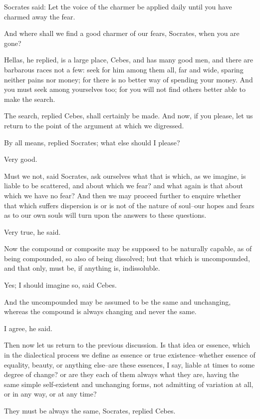 Socrates said: Let the voice of the charmer be applied daily until you
have charmed away the fear.

And where shall we find a good charmer of our fears, Socrates, when you
are gone?

Hellas, he replied, is a large place, Cebes, and has many good men, and
there are barbarous races not a few: seek for him among them all, far
and wide, sparing neither pains nor money; for there is no better way
of spending your money. And you must seek among yourselves too; for you
will not find others better able to make the search.

The search, replied Cebes, shall certainly be made. And now, if
you please, let us return to the point of the argument at which we
digressed.

By all means, replied Socrates; what else should I please?

Very good.

Must we not, said Socrates, ask ourselves what that is which, as we
imagine, is liable to be scattered, and about which we fear? and what
again is that about which we have no fear? And then we may proceed
further to enquire whether that which suffers dispersion is or is not
of the nature of soul--our hopes and fears as to our own souls will turn
upon the answers to these questions.

Very true, he said.

Now the compound or composite may be supposed to be naturally capable,
as of being compounded, so also of being dissolved; but that which is
uncompounded, and that only, must be, if anything is, indissoluble.

Yes; I should imagine so, said Cebes.

And the uncompounded may be assumed to be the same and unchanging,
whereas the compound is always changing and never the same.

I agree, he said.

Then now let us return to the previous discussion. Is that idea or
essence, which in the dialectical process we define as essence or true
existence--whether essence of equality, beauty, or anything else--are
these essences, I say, liable at times to some degree of change? or
are they each of them always what they are, having the same simple
self-existent and unchanging forms, not admitting of variation at all,
or in any way, or at any time?

They must be always the same, Socrates, replied Cebes.


